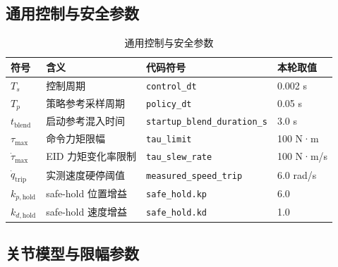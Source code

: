\documentclass[12pt,a4paper]{ctexart}
\begin{document}
\subsection{通用控制与安全参数}


\begin{table}[htbp]
\centering
\footnotesize
\caption{通用控制与安全参数}
\begin{tabularx}{\textwidth}{@{}p{}p{}p{}p{}@{}}
\toprule
符号 & 含义 & 代码符号 & 本轮取值 \\
\midrule
$T_s$ & 控制周期 & \texttt{control\_dt} & 0.002 s \\
$T_p$ & 策略参考采样周期 & \texttt{policy\_dt} & 0.05 s \\
$t_\mathrm{blend}$ & 启动参考混入时间 & \texttt{startup\_blend\_duration\_s} & 3.0 s \\
$\tau_{\max}$ & 命令力矩限幅 & \texttt{tau\_limit} & 100 N·m \\
$\dot{\tau}_{\max}$ & EID 力矩变化率限制 & \texttt{tau\_slew\_rate} & 100 N·m/s \\
$\dot q_\mathrm{trip}$ & 实测速度硬停阈值 & \texttt{measured\_speed\_trip} & 6.0 rad/s \\
$k_{p,\mathrm{hold}}$ & safe-hold 位置增益 & \texttt{safe\_hold.kp} & 6.0 \\
$k_{d,\mathrm{hold}}$ & safe-hold 速度增益 & \texttt{safe\_hold.kd} & 1.0 \\
\bottomrule
\end{tabularx}
\end{table}


\subsection{关节模型与限幅参数}
\end{document}
